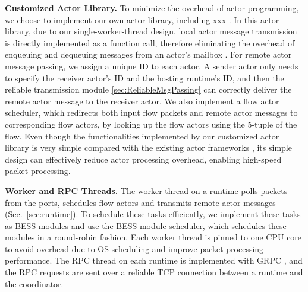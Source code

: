 \vspace{1mm}
\noindent \textbf{Customized Actor Library.} To minimize the overhead of actor programming, we choose to implement our own actor library, including xxx . In this actor library, due to our single-worker-thread design, local actor message transmission is directly implemented as a function call, therefore eliminating the overhead of enqueuing and dequeuing messages from an actor's mailbox \cite{actor-wiki}. For remote actor message passing, we assign a unique ID to each actor. A sender actor only needs to specify the receiver actor's ID and the hosting runtime's ID, and then the reliable transmission module \ref{sec:ReliableMsgPassing} can correctly deliver the remote actor message to the receiver actor. We also implement a flow actor scheduler, %
 which redirects both input flow packets and remote actor messages to corresponding flow actors, by looking up the flow actors using the 5-tuple of the flow.
 Even though the functionalities implemented by our customized actor library is very simple compared with the existing actor frameworks \cite{akka} \cite{caf}, its simple design can effectively reduce actor processing overhead, enabling high-speed packet processing. %


\vspace{1mm}
\noindent \textbf{Worker and RPC Threads.}
The worker thread on a runtime polls packets from the ports, schedules flow actors and transmits remote actor messages (Sec.~\ref{sec:runtime}). To schedule these tasks efficiently, we implement these tasks as BESS modules and use the BESS module scheduler, which schedules these modules in a round-robin fashion. Each worker thread is pinned to one CPU core to avoid overhead due to OS scheduling and improve packet processing performance. The RPC thread on each runtime is implemented with GRPC \cite{grpc}, and the RPC requests are sent over a reliable TCP connection between a runtime and the coordinator. 

